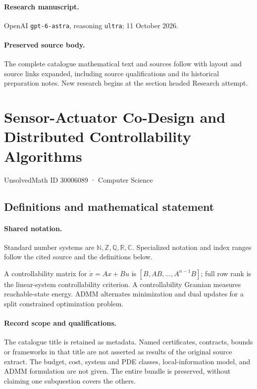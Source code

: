 \documentclass[11pt]{article}
\begin{document}
\paragraph{Research manuscript.} OpenAI \texttt{gpt-6-astra}, reasoning \texttt{ultra}; 11 October 2026.
\paragraph{Preserved source body.} The complete catalogue mathematical text and sources follow with layout and source links expanded, including source qualifications and its historical preparation notes. New research begins at the section headed Research attempt.

\section{Sensor-Actuator Co-Design and Distributed Controllability Algorithms}\label{30006089}
{\small UnsolvedMath ID 30006089 · Computer Science}
\subsection{Definitions and mathematical statement}

\paragraph{Shared notation.}Standard number systems are $\mathbb N,\mathbb Z,\mathbb Q,\mathbb R,\mathbb C$. Specialized notation and index ranges follow the cited source and the definitions below.


A controllability matrix for $\dot x=Ax+Bu$ is $[B,AB,\ldots,A^{n-1}B]$; full row rank is the linear-system controllability criterion. A controllability Gramian measures reachable-state energy. ADMM alternates minimization and dual updates for a split constrained optimization problem.
\paragraph{Record scope and qualifications.}
The catalogue title is retained as metadata. Named certificates, contracts, bounds or frameworks in that title are not asserted as results of the original source extract.
The budget, cost, system and PDE classes, local-information model, and ADMM formulation are not given. The entire bundle is preserved, without claiming one subquestion covers the others.
\end{document}
